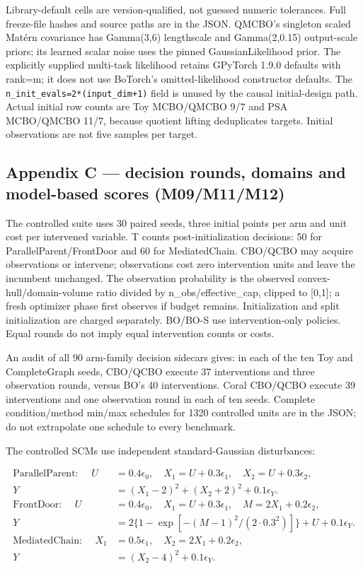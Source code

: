 Library-default cells are version-qualified, not guessed numeric tolerances. Full freeze-file hashes and source paths are in the JSON. QMCBO's singleton scaled Matérn covariance has Gamma(3,6) lengthscale and Gamma(2,0.15) output-scale priors; its learned scalar noise uses the pinned GaussianLikelihood prior. The explicitly supplied multi-task likelihood retains GPyTorch 1.9.0 defaults with rank=m; it does not use BoTorch's omitted-likelihood constructor defaults. The \nolinkurl{n_init_evals=2*(input_dim+1)} field is unused by the causal initial-design path. Actual initial row counts are Toy MCBO/QMCBO 9/7 and PSA MCBO/QMCBO 11/7, because quotient lifting deduplicates targets. Initial observations are not five samples per target.

\subsection*{Appendix C --- decision rounds, domains and model-based scores (M09/M11/M12)}

The controlled suite uses 30 paired seeds, three initial points per arm and unit cost per intervened variable. T counts post-initialization decisions: 50 for ParallelParent/FrontDoor and 60 for MediatedChain. CBO/QCBO may acquire observations or intervene; observations cost zero intervention units and leave the incumbent unchanged. The observation probability is the observed convex-hull/domain-volume ratio divided by n\_obs/effective\_cap, clipped to [0,1]; a fresh optimizer phase first observes if budget remains. Initialization and split initialization are charged separately. BO/BO-S use intervention-only policies. Equal rounds do not imply equal intervention counts or costs.

An audit of all 90 arm-family decision sidecars gives: in each of the ten Toy and CompleteGraph seeds, CBO/QCBO execute 37 interventions and three observation rounds, versus BO's 40 interventions. Coral CBO/QCBO execute 39 interventions and one observation round in each of ten seeds. Complete condition/method min/max schedules for 1320 controlled units are in the JSON; do not extrapolate one schedule to every benchmark.

The controlled SCMs use independent standard-Gaussian disturbances:

\[
\begin{aligned}
\text{ParallelParent: }\quad U&=0.4\epsilon_0,\quad X_1=U+0.3\epsilon_1,\quad X_2=U+0.3\epsilon_2,\\
Y&=(X_1-2)^2+(X_2+2)^2+0.1\epsilon_Y.\\[2pt]
\text{FrontDoor: }\quad U&=0.4\epsilon_0,\quad X_1=U+0.3\epsilon_1,\quad M=2X_1+0.2\epsilon_2,\\
Y&=2\{1-\exp[-(M-1)^2/(2\cdot0.3^2)]\}+U+0.1\epsilon_Y.\\[2pt]
\text{MediatedChain: }\quad X_1&=0.5\epsilon_1,\quad X_2=2X_1+0.2\epsilon_2,\\
Y&=(X_2-4)^2+0.1\epsilon_Y.
\end{aligned}
\]

